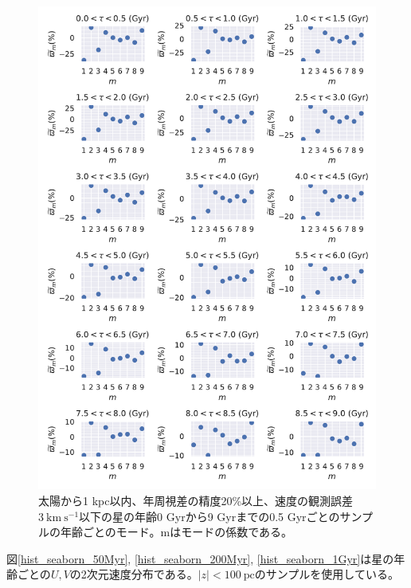 \begin{figure}[htbp]
\begin{center}
	\includegraphics[width=14cm]{fig/mode_plx-age.pdf}
	\caption{太陽から1 kpc以内、年周視差の精度20\%以上、速度の観測誤差$3\ \mathrm{km\ s^{-1}}$以下の星の年齢0 Gyrから9 Gyrまでの0.5 Gyrごとのサンプルの年齢ごとのモード。mはモードの係数である。}
	\label{mode_plx-age}
\end{center}
\end{figure}

図\ref{hist_seaborn_50Myr}, \ref{hist_seaborn_200Myr}, \ref{hist_seaborn_1Gyr}は星の年齢ごとの$U,V$の2次元速度分布である。$|z|<100\ \mathrm{pc}$のサンプルを使用している。

